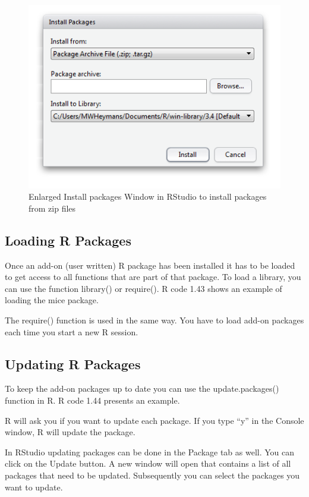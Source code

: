 \documentclass[]{book}
\theoremstyle{definition}
\theoremstyle{definition}
\theoremstyle{definition}
\theoremstyle{remark}
\begin{document}
\begin{figure}

{\centering \includegraphics[width=0.9\linewidth]{images/fig1.26b} 

}

\caption{Enlarged Install packages Window in RStudio to install packages from zip files}\label{fig:fig28}
\end{figure}

\subsection{Loading R Packages}\label{loading-r-packages}

Once an add-on (user written) R package has been installed it has to be
loaded to get access to all functions that are part of that package. To
load a library, you can use the function library() or require(). R code
1.43 shows an example of loading the mice package.

The require() function is used in the same way. You have to load add-on
packages each time you start a new R session.

\subsection{Updating R Packages}\label{updating-r-packages}

To keep the add-on packages up to date you can use the update.packages()
function in R. R code 1.44 presents an example.

R will ask you if you want to update each package. If you type ``y'' in
the Console window, R will update the package.

In RStudio updating packages can be done in the Package tab as well. You
can click on the Update button. A new window will open that contains a
list of all packages that need to be updated. Subsequently you can
select the packages you want to update.
\end{document}
